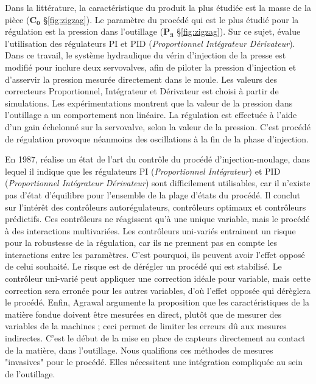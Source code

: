 Dans la littérature, la caractéristique du produit la plus étudiée est la masse de la pièce ($\boldsymbol{C_0}$ §\ref{fig:zigzag}).
Le paramètre du procédé qui est le plus étudié pour la régulation est la pression dans l'outillage \cite{fara_evaluation_1985, kamal_dynamics_1987} ($\boldsymbol{P_3}$ §\ref{fig:zigzag}).
Sur ce sujet, \cite{fara_control_1988} évalue l'utilisation des régulateurs PI et PID (\textit{Proportionnel Intégrateur Dérivateur}).
Dans ce travail, le système hydraulique du vérin d’injection de la presse est modifié pour inclure deux servovalves, afin de piloter la pression d’injection et d’asservir la pression mesurée directement dans le moule.
Les valeurs des correcteurs Proportionnel, Intégrateur et Dérivateur est choisi à partir de simulations.
Les expérimentations montrent que la valeur de la pression dans l'outillage a un comportement non linéaire.
La régulation est effectuée à l'aide d'un gain échelonné sur la servovalve, selon la valeur de la pression.
C’est procédé de régulation provoque néanmoins des oscillations à la fin de la phase d'injection.

En 1987, \cite{agrawal_injection-molding_1987} réalise un état de l'art du contrôle du procédé d’injection-moulage, dans lequel il indique que les régulateurs PI (\textit{Proportionnel Intégrateur}) et PID (\textit{Proportionnel Intégrateur Dérivateur}) sont difficilement utilisables, car il n’existe pas d’état d’équilibre pour l’ensemble de la plage d'états du procédé.
Il conclut sur l’intérêt des contrôleurs autorégulateurs, contrôleurs optimaux et contrôleurs prédictifs.
Ces contrôleurs ne réagissent qu’à une unique variable, mais le procédé à des interactions multivariées.
Les contrôleurs uni-variés entrainent un risque pour la robustesse de la régulation, car ils ne prennent pas en compte les interactions entre les paramètres.
C'est pourquoi, ils peuvent avoir l'effet opposé de celui souhaité.
Le risque est de dérégler un procédé qui est stabilisé.
Le contrôleur uni-varié peut appliquer une correction idéale pour variable, mais cette correction sera erronée pour les autres variables, d'où l'effet opposée qui dérèglera le procédé.
Enfin, Agrawal argumente la proposition que les caractéristiques de la matière fondue doivent être mesurées en direct, plutôt que de mesurer des variables de la machines ; ceci permet de limiter les erreurs dû aux mesures indirectes.
C'est le début de la mise en place de capteurs directement au contact de la matière, dans l'outillage.
Nous qualifions ces méthodes de mesures "invasives" pour le procédé.
Elles nécessitent une intégration compliquée au sein de l'outillage.

